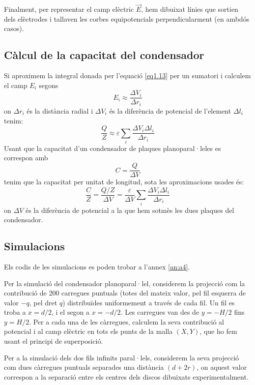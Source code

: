 \documentclass[a4paper,10.5pt]{report}
\begin{document}
Finalment, per representar el camp elèctric $\vec{E}$, hem dibuixat línies que sortien dels elèctrodes i tallaven les corbes equipotencials perpendicularment (en ambdós casos). 

\subsection{Càlcul de la capacitat del condensador}
Si aproximem la integral donada per l'equació \eqref{eq1.13} per un sumatori i calculem el camp $E_i$ segons
\begin{equation}
	E_i \approx \frac{\Delta V_i}{\Delta r_i} \label{eq1.14}
\end{equation}
on $\Delta r_i$ és la distància radial i $\Delta V_i$ és la diferència de potencial de l'element $\Delta l_i$ tenim:
\begin{equation}
	\frac{Q}{Z} \approx \varepsilon \sum_i \frac{\Delta V_i \Delta l_i}{\Delta r_i}
\end{equation}
Usant que la capacitat d'un condensador de plaques planoparal·leles es correspon amb 
\begin{equation}
	C = \frac{Q}{\Delta V}
\end{equation}
tenim que la capacitat per unitat de longitud, sota les aproximacions usades és:
\begin{equation}
	\frac{C}{Z} = \frac{Q/Z}{\Delta V} = \frac{\varepsilon}{\Delta V} \sum_i \frac{\Delta V_i \Delta l_i}{\Delta r_i} \label{eq1.17}
\end{equation}
on $\Delta V$ és la diferència de potencial a la que hem sotmès les dues plaques del condensador.

\subsection{Simulacions}
Els codis de les simulacions es poden trobar a l'annex \ref{an:a4}.

Per la simulació del condensador planoparal·lel, considerem la projecció com la contribució de 200 carregues puntuals (totes del mateix valor, pel fil esquerra de valor $-q$, pel dret $q$) distribuïdes uniformement a través de cada fil. Un fil es troba a $x = d/2$, i el segon a $x = - d/2$. Les carregues van des de $y = -H/2$ fins $y = H/2$. Per a cada una de les càrregues, calculem la seva contribució al potencial i al camp elèctric en tots els punts de la malla $(X, Y)$, que ho fem usant el principi de superposició.

Per a la simulació dels dos fils infinits paral·lels, considerem la seva projecció com dues càrregues puntuals separades una distància $(d+2r)$, on aquest valor correspon a la separació entre els centres dels discos dibuixats experimentalment.
\end{document}
